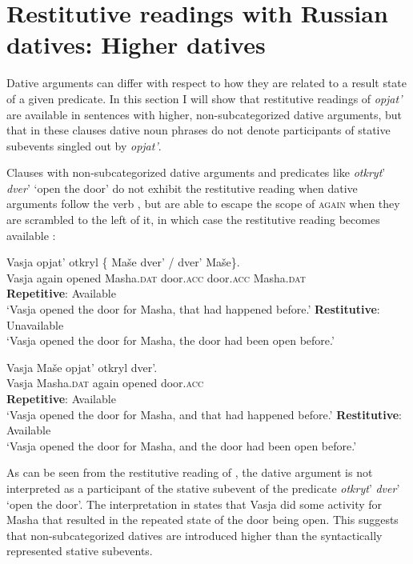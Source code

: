 \documentclass[output=paper]{langscibook}
\begin{document}
\section{Restitutive readings with Russian datives: Higher datives}\label{s4}

Dative arguments can differ with respect to how they are related to a result state of a given predicate. In this section I will show that restitutive readings of \textit{opjat’} are available in sentences with higher, non-subcategorized dative arguments, but that in these clauses dative noun phrases do not denote participants of stative subevents singled out by \textit{opjat’}.

 
Clauses with non-subcategorized dative arguments and predicates like \textit{otkryt}’ \textit{dver}’ ‘open the door’ do not exhibit the restitutive reading when dative arguments follow the verb , but are able to escape the scope of \textsc{again} when they are scrambled to the left of it, in which case the restitutive reading becomes available :


 \ea\label{ex:bondarenko:31}
\gll Vasja opjat’ otkryl \{\hspace{-2pt} Maše dver’ / dver’ Maše\}.\\
     Vasja again opened {} Masha.\textsc{dat} door.\textsc{acc} {} door.\textsc{acc} Masha.\textsc{dat}\\
\ea \textbf{Repetitive}: Available\\
`Vasja opened the door for Masha, that had happened before.'
\ex  \textbf{Restitutive}: Unavailable\\
`Vasja opened the door for Masha, the door had been open   before.'
\z\z

 \ea\label{ex:bondarenko:32}
\gll Vasja Maše opjat’ otkryl dver’.\\
     Vasja Masha.\textsc{dat} again opened door.\textsc{acc}\\
\ea \textbf{Repetitive}: Available\\
`Vasja opened the door for Masha, and that had happened   before.'
\ex \textbf{Restitutive}: Available\label{ex:bondarenko:32b}\\
`Vasja opened the door for Masha, and the door had been open   before.'
\z\z


\noindent As can be seen from the restitutive reading of , the dative argument is not interpreted as a participant of the stative subevent of the predicate \textit{otkryt}’ \textit{dver}’ ‘open the door’. The interpretation in  states that Vasja did some activity for Masha that resulted in the repeated state of the door being open. This suggests that non-subcategorized datives are introduced higher than the syntactically represented stative subevents.
\end{document}

